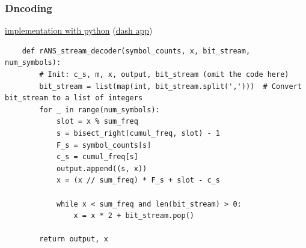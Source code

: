 \subsubsection{Dncoding}
\begin{frame}[fragile]
    \href{http://localhost:8050}{implementation with python} (\href{https://github.com/hurryclear/cs_theory/tree/data_compression/24ws_data_compression/implementation}{dash app})
    \begin{verbatim}
    def rANS_stream_decoder(symbol_counts, x, bit_stream, num_symbols):
        # Init: c_s, m, x, output, bit_stream (omit the code here)
        bit_stream = list(map(int, bit_stream.split(',')))  # Convert bit_stream to a list of integers
        for _ in range(num_symbols):
            slot = x % sum_freq
            s = bisect_right(cumul_freq, slot) - 1
            F_s = symbol_counts[s]
            c_s = cumul_freq[s]
            output.append((s, x))
            x = (x // sum_freq) * F_s + slot - c_s

            while x < sum_freq and len(bit_stream) > 0: 
                x = x * 2 + bit_stream.pop()
        
        return output, x
    \end{verbatim}
\end{frame}